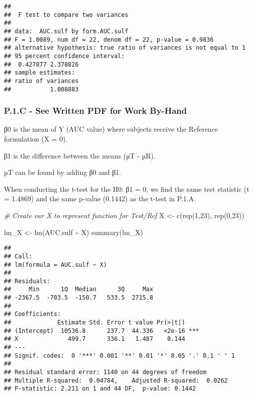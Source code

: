 \documentclass[
]{article}
\newenvironment{Shaded}{\begin{snugshade}}{\end{snugshade}}
\newcommand{\CommentTok}[1]{\textcolor[rgb]{0.56,0.35,0.01}{\textit{#1}}}
\newcommand{\DecValTok}[1]{\textcolor[rgb]{0.00,0.00,0.81}{#1}}
\newcommand{\FunctionTok}[1]{\textcolor[rgb]{0.00,0.00,0.00}{#1}}
\newcommand{\NormalTok}[1]{#1}
\newcommand{\OtherTok}[1]{\textcolor[rgb]{0.56,0.35,0.01}{#1}}
\newcommand{\SpecialCharTok}[1]{\textcolor[rgb]{0.00,0.00,0.00}{#1}}
\begin{document}
\begin{verbatim}
## 
##  F test to compare two variances
## 
## data:  AUC.sulf by form.AUC.sulf
## F = 1.0089, num df = 22, denom df = 22, p-value = 0.9836
## alternative hypothesis: true ratio of variances is not equal to 1
## 95 percent confidence interval:
##  0.427877 2.378826
## sample estimates:
## ratio of variances 
##           1.008883
\end{verbatim}

\hypertarget{p.1.c---see-written-pdf-for-work-by-hand}{%
\subsubsection{P.1.C - See Written PDF for Work
By-Hand}\label{p.1.c---see-written-pdf-for-work-by-hand}}

β0 is the mean of Y (AUC value) where subjects receive the Reference
formulation (X = 0).

β1 is the difference between the means (µT - µR).

µT can be found by adding β0 and β1.

When conducting the t-test for the H0: β1 = 0, we find the same test
statistic (\textbar t\textbar{} = 1.4869) and the same p-value (0.1442)
as the t-test in P.1.A.

\begin{Shaded}
\begin{Highlighting}[]
\CommentTok{\# Create var X to represent function for Test/Ref}
\NormalTok{X }\OtherTok{\textless{}{-}} \FunctionTok{c}\NormalTok{(}\FunctionTok{rep}\NormalTok{(}\DecValTok{1}\NormalTok{,}\DecValTok{23}\NormalTok{), }\FunctionTok{rep}\NormalTok{(}\DecValTok{0}\NormalTok{,}\DecValTok{23}\NormalTok{))}

\NormalTok{lm\_X }\OtherTok{\textless{}{-}} \FunctionTok{lm}\NormalTok{(AUC.sulf }\SpecialCharTok{\textasciitilde{}}\NormalTok{ X)}
\FunctionTok{summary}\NormalTok{(lm\_X)}
\end{Highlighting}
\end{Shaded}

\begin{verbatim}
## 
## Call:
## lm(formula = AUC.sulf ~ X)
## 
## Residuals:
##     Min      1Q  Median      3Q     Max 
## -2367.5  -703.5  -150.7   533.5  2715.8 
## 
## Coefficients:
##             Estimate Std. Error t value Pr(>|t|)    
## (Intercept)  10536.8      237.7  44.336   <2e-16 ***
## X              499.7      336.1   1.487    0.144    
## ---
## Signif. codes:  0 '***' 0.001 '**' 0.01 '*' 0.05 '.' 0.1 ' ' 1
## 
## Residual standard error: 1140 on 44 degrees of freedom
## Multiple R-squared:  0.04784,    Adjusted R-squared:  0.0262 
## F-statistic: 2.211 on 1 and 44 DF,  p-value: 0.1442
\end{verbatim}
\end{document}
